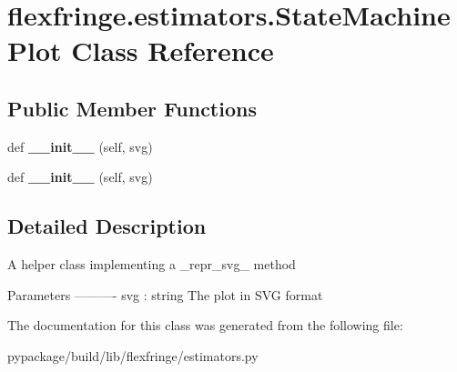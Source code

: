 \hypertarget{classflexfringe_1_1estimators_1_1_state_machine_plot}{}\section{flexfringe.\+estimators.\+State\+Machine\+Plot Class Reference}
\label{classflexfringe_1_1estimators_1_1_state_machine_plot}
\subsection*{Public Member Functions}
\begin{DoxyCompactItemize}
\item 
def {\bfseries \+\_\+\+\_\+init\+\_\+\+\_\+} (self, svg)\hypertarget{classflexfringe_1_1estimators_1_1_state_machine_plot_a53f8a6daf2a2ae3a5e5f9d835a44af42}{}\label{classflexfringe_1_1estimators_1_1_state_machine_plot_a53f8a6daf2a2ae3a5e5f9d835a44af42}

\item 
def {\bfseries \+\_\+\+\_\+init\+\_\+\+\_\+} (self, svg)\hypertarget{classflexfringe_1_1estimators_1_1_state_machine_plot_a53f8a6daf2a2ae3a5e5f9d835a44af42}{}\label{classflexfringe_1_1estimators_1_1_state_machine_plot_a53f8a6daf2a2ae3a5e5f9d835a44af42}

\end{DoxyCompactItemize}


\subsection{Detailed Description}
\begin{DoxyVerb}A helper class implementing a _repr_svg_ method

Parameters
----------
svg : string
    The plot in SVG format
\end{DoxyVerb}
 

The documentation for this class was generated from the following file\+:\begin{DoxyCompactItemize}
\item 
pypackage/build/lib/flexfringe/estimators.\+py\end{DoxyCompactItemize}
